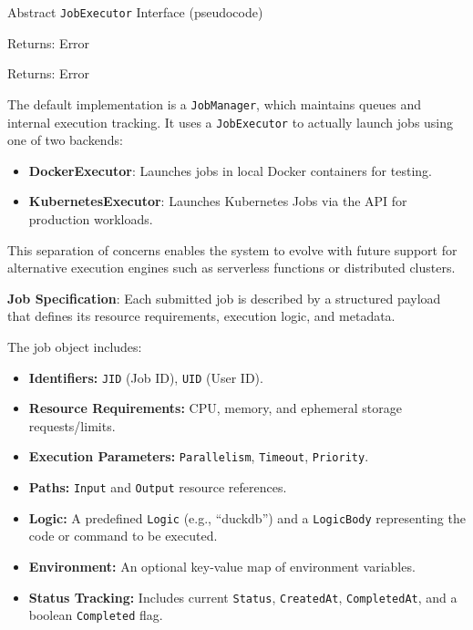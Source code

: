 \begin{algorithm}[H]
\caption{Abstract \texttt{JobExecutor} Interface (pseudocode)}
\begin{algorithmic}
  \State Returns: Error
\EndFunction

  \State Returns: Error
\EndFunction

\end{algorithmic}
\end{algorithm}



The default implementation is a \texttt{JobManager}, which maintains queues and internal execution tracking. It uses a \texttt{JobExecutor} to actually launch jobs using one of two backends:
\begin{itemize}
    \item \textbf{DockerExecutor}: Launches jobs in local Docker containers for testing.
    \item \textbf{KubernetesExecutor}: Launches Kubernetes Jobs via the API for production workloads.
\end{itemize}

This separation of concerns enables the system to evolve with future support for alternative execution engines such as serverless functions or distributed clusters.

\textbf{Job Specification}: Each submitted job is described by a structured payload that defines its resource requirements, execution logic, and metadata.

The job object includes:

\begin{itemize}
    \item \textbf{Identifiers:} \texttt{JID} (Job ID), \texttt{UID} (User ID).
    \item \textbf{Resource Requirements:} CPU, memory, and ephemeral storage requests/limits.
    \item \textbf{Execution Parameters:} \texttt{Parallelism}, \texttt{Timeout}, \texttt{Priority}.
    \item \textbf{Paths:} \texttt{Input} and \texttt{Output} resource references.
    \item \textbf{Logic:} A predefined \texttt{Logic} (e.g., ``duckdb'') and a \texttt{LogicBody} representing the code or command to be executed.
    \item \textbf{Environment:} An optional key-value map of environment variables.
    \item \textbf{Status Tracking:} Includes current \texttt{Status}, \texttt{CreatedAt}, \texttt{CompletedAt}, and a boolean \texttt{Completed} flag.
\end{itemize}

